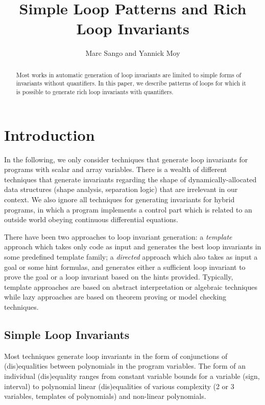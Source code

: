 \documentclass[a4paper,10pt]{article}
\begin{document}
\title{Simple Loop Patterns and Rich Loop Invariants}
\author{Marc Sango and Yannick Moy}
\date{}

\maketitle

\begin{abstract}
  Most works in automatic generation of loop invariants are limited to simple
  forms of invariants without quantifiers. In this paper, we describe patterns
  of loops for which it is possible to generate rich loop invariants with
  quantifiers.
\end{abstract}

\section{Introduction}

In the following, we only consider techniques that generate loop invariants for
programs with scalar and array variables. There is a wealth of different
techniques that generate invariants regarding the shape of
dynamically-allocated data structures (shape analysis, separation logic) that
are irrelevant in our context. We also ignore all techniques for generating
invariants for hybrid programs, in which a program implements a control part
which is related to an outside world obeying continuous differential equations.

There have been two approaches to loop invariant generation: a
\textit{template} approach which takes only code as input and generates the
best loop invariants in some predefined template family; a \textit{directed}
approach which also takes as input a goal or some hint formulas, and generates
either a sufficient loop invariant to prove the goal or a loop invariant based
on the hints provided. Typically, template approaches are based on abstract
interpretation or algebraic techniques while lazy approaches are based on
theorem proving or model checking techniques.

\subsection{Simple Loop Invariants}

Most techniques generate loop invariants in the form of conjunctions of
(dis)equalities between polynomials in the program variables. The form of an
individual (dis)equality ranges from constant variable bounds for a variable
(sign, interval) to polynomial linear (dis)equalities of various complexity (2
or 3 variables, templates of polynomials) and non-linear polynomials.
\end{document}
